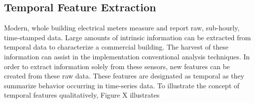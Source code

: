 \subsection{Temporal Feature Extraction}
Modern, whole building electrical meters measure and report raw, sub-hourly, time-stamped data. Large amounts of intrinsic information can be extracted from temporal data to characterize a commercial building. The harvest of these information can assist in the implementation conventional analysis techniques. In order to extract information solely from these sensors, new features can be created from these raw data. These features are designated as temporal as they summarize behavior occurring in time-series data. To illustrate the concept of temporal features qualitatively, Figure X illustrates
